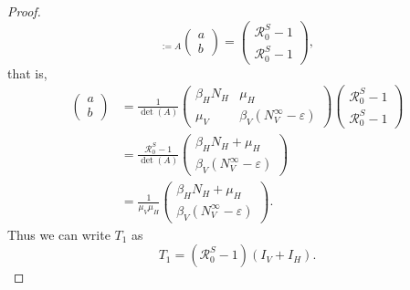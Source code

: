 \begin{proof}
\begin{equation*}
{        }_{:=A}
%
        \begin{pmatrix}
            a
            \\
            b
        \end{pmatrix}
        =
        \begin{pmatrix}
            \mathcal{R}_0 ^ S - 1
            \\
            \mathcal{R}_0 ^ S - 1
        \end{pmatrix},
    \end{equation*}
    that is,
    \begin{equation} \label{eqn:ab_as_linear_solution}
        \begin{aligned}
            \begin{pmatrix}
                a
                \\
                b
            \end{pmatrix}
            & =
            \frac{1}{\det(A)}
            \begin{pmatrix}
                \beta_H N_H
                    & \mu_H
                \\
                \mu_V
                    & \beta_V \left(N_V ^ {\infty} -\varepsilon\right)
                    
            \end{pmatrix}
            \begin{pmatrix}
                \mathcal{R}_0 ^ S - 1
                \\
                \mathcal{R}_0 ^ S - 1
            \end{pmatrix}
            \\
            & =
            \frac{\mathcal{R}_0 ^ S - 1}{\det(A)}
            \begin{pmatrix}
                \beta_H N_H + \mu_H
                \\
                \beta_V \left(N_V ^ {\infty} -\varepsilon\right)
            \end{pmatrix}
            \\
            & =
            \frac{1}{\mu_V \mu_H}
            \begin{pmatrix}
                \beta_H N_H + \mu_H
                \\
                \beta_V \left(N_V ^ {\infty} -\varepsilon\right)
            \end{pmatrix}.
        \end{aligned}
    \end{equation}
%
%
%
%
    Thus we can write $T_1$ as
    \begin{equation} \label{eqn:T1_equivalence}
        T_1 = (\mathcal{R}_0 ^ S - 1)(I_V + I_H).
    \end{equation}
    

\end{proof}
